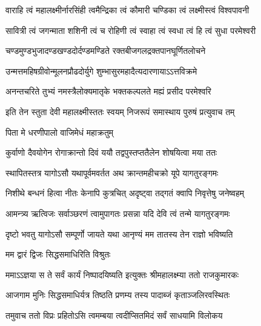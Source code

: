 \twolineshloka
{वाराहि त्वं महालक्ष्मीर्नारसिंही त्वमैन्द्रिका}
{त्वं कौमारी चण्डिका त्वं लक्ष्मीस्त्वं विश्वपावनी} %

\twolineshloka
{सावित्री त्वं जगन्माता शशिनी त्वं च रोहिणी}
{त्वं स्वाहा त्वं स्वधा त्वं हि त्वं सुधा परमेश्वरी} %

\twolineshloka
{चण्डमुण्डभुजादण्डखण्डदोर्दण्डमण्डिते}
{रक्तबीजगलद्रक्तपानघूर्णितलोचने} %

\twolineshloka
{उन्मत्तमहिषग्रीवोन्मूलनप्रौढदोर्युगे}
{शुम्भासुरमहादैत्यदारणायाऽऽत्तविक्रमे} %

\twolineshloka
{अनन्तचरिते तुभ्यं नमस्त्रैलोक्यमातृके}
{भक्तकल्पलते मह्यं प्रसीद परमेश्वरि} %

\twolineshloka
{इति तेन स्तुता देवी महालक्ष्मीस्ततः स्वयम्}
{निजरूपं समास्थाय पुरुषं प्रत्युवाच तम्} %




\onelineshloka
{पिता मे धरणीपालो वाजिमेधं महाक्रतुम्} %

\twolineshloka
{कुर्वाणो दैवयोगेन रोगाक्रान्तो दिवं ययौ}
{तद्वपुस्तप्ततैलेन शोषयित्वा मया ततः} %

\twolineshloka
{स्थापितस्तत्र यागोऽसौ यथापूर्वमवर्तत}
{अथ क्रान्तमहीचक्रो यूपे यागतुरङ्गमः} %

\twolineshloka
{निशीथे बन्धनं हित्वा नीतः केनापि कुत्रचित्}
{अदृष्ट्वा तद्गतं क्वापि निवृत्तेषु जनेष्वहम्} %

\twolineshloka
{आमन्त्र्य ऋत्विजः सर्वाञ्छरणं त्वामुपागतः}
{प्रसन्ना यदि देवि त्वं तन्मे यागतुरङ्गमः} %

\twolineshloka
{दृष्टो भवतु यागोऽसौ सम्पूर्णो जायते यथा}
{आनृण्यं मम तातस्य तेन राज्ञो भविष्यति} %



\onelineshloka
{मम द्वारं द्विजः सिद्धसमाधिरिति विश्रुतः} %

\twolineshloka
{ममाऽऽज्ञया स ते सर्वं कार्यं निष्पादयिष्यति}
{इत्युक्तः श्रीमहालक्ष्म्या ततो राजकुमारकः} %

\twolineshloka
{आजगाम मुनिः सिद्धसमाधिर्यत्र तिष्ठति}
{प्रणम्य तस्य पादाब्जं कृताञ्जलिरवस्थितः} %

\twolineshloka
{तमुवाच ततो विप्रः प्रहितोऽसि त्वमम्बया}
{त्वदीप्सितमिदं सर्वं साधयामि विलोकय} %

